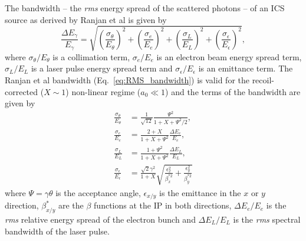 \documentclass[../main.tex]{subfiles}
\begin{document}
The bandwidth -- the \textit{rms} energy spread of the scattered photons -- of an ICS source as derived by Ranjan et al \cite{ranjan2018simulation} is given by
\begin{equation}
\frac{\Delta E_{\gamma}}{E_{\gamma}} = \sqrt{\left(\frac{\sigma_{\theta}}{E_{\theta}}\right)^{2}+\left(\frac{\sigma_{e}}{E_{e}}\right)^{2}+\left(\frac{\sigma_{L}}{E_{L}}\right)^{2}+\left(\frac{\sigma_{\epsilon}}{E_{\epsilon}}\right)^{2}},
\label{eq:RMS_bandwidth}    
\end{equation}
where $\sigma_{\theta}/E_{\theta}$ is a collimation term, $\sigma_{e}/E_{e}$ is an electron beam energy spread term, $\sigma_{L}/E_{L}$ is a laser pulse energy spread term and $\sigma_{\epsilon}/E_{\epsilon}$ is an emittance term. The Ranjan et al bandwidth (Eq.~\ref{eq:RMS_bandwidth}) is valid for the recoil-corrected ($X\sim 1$) non-linear regime ($a_{0}\ll 1$) and the terms of the bandwidth are given by
\begin{align}
\frac{\sigma_{\theta}}{E_{\theta}} &= \frac{1}{\sqrt{12}}\frac{\Psi^{2}}{1+X+\Psi^{2}/2},
\label{eq:collimation_term} \\
\frac{\sigma_{e}}{E_{e}} &= \frac{2+X}{1+X+\Psi^{2}}\frac{\Delta E_{e}}{E_{e}},
\label{eq:beam_energy_spread_term} \\
\frac{\sigma_{L}}{E_{L}} &= \frac{1+\Psi^{2}}{1+X+\Psi^{2}}\frac{\Delta E_{L}}{E_{L}},
\label{eq:laser_energy_spread_term} \\
\frac{\sigma_{\epsilon}}{E_{\epsilon}} &= \frac{\sqrt{2}\gamma^{2}}{1+X}\sqrt{\frac{\epsilon_{x}^{2}}{\beta_{x}^{*2}}+\frac{\epsilon_{y}^{2}}{\beta_{y}^{*2}}}
\label{eq:emittance_term}
\end{align}
where $\Psi = \gamma\theta$ is the acceptance angle, $\epsilon_{x/y}$ is the emittance in the $x$ or $y$ direction, $\beta_{x/y}^{*}$ are the $\beta$ functions at the IP in both directions, $\Delta E_{e}/E_{e}$ is the \textit{rms} relative energy spread of the electron bunch and $\Delta E_{L}/E_{L}$ is the \textit{rms} spectral bandwidth of the laser pulse.
\end{document}
